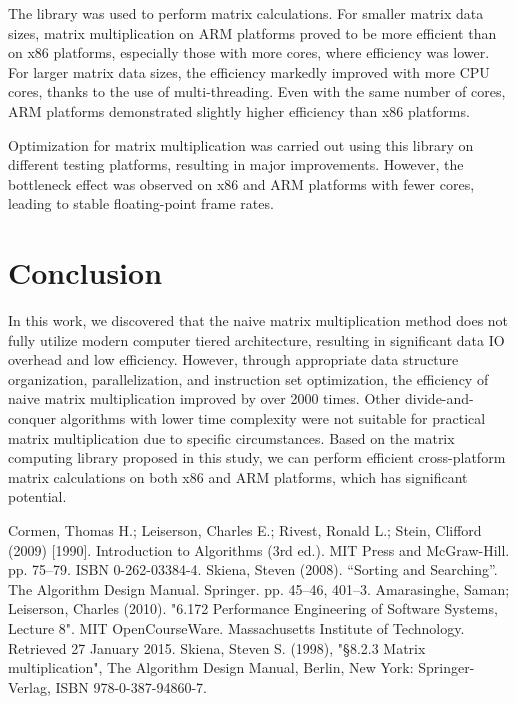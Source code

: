 \documentclass[conference]{IEEEtran}
\begin{document}
	The library was used to perform matrix calculations. For smaller matrix data sizes, matrix multiplication on ARM platforms proved to be more efficient than on x86 platforms, especially those with more cores, where efficiency was lower. For larger matrix data sizes, the efficiency markedly improved with more CPU cores, thanks to the use of multi-threading. Even with the same number of cores, ARM platforms demonstrated slightly higher efficiency than x86 platforms.
	
	Optimization for matrix multiplication was carried out using this library on different testing platforms, resulting in major improvements. However, the bottleneck effect was observed on x86 and ARM platforms with fewer cores, leading to stable floating-point frame rates.
	\section{Conclusion}
	
	In this work, we discovered that the naive matrix multiplication method does not fully utilize modern computer tiered architecture, resulting in significant data IO overhead and low efficiency. However, through appropriate data structure organization, parallelization, and instruction set optimization, the efficiency of naive matrix multiplication improved by over 2000 times. Other divide-and-conquer algorithms with lower time complexity were not suitable for practical matrix multiplication due to specific circumstances. Based on the matrix computing library proposed in this study, we can perform efficient cross-platform matrix calculations on both x86 and ARM platforms, which has significant potential.
	
	\begin{thebibliography}{00}
		 Cormen, Thomas H.; Leiserson, Charles E.; Rivest, Ronald L.; Stein, Clifford (2009) [1990]. Introduction to Algorithms (3rd ed.). MIT Press and McGraw-Hill. pp. 75–79. ISBN 0-262-03384-4.
		  Skiena, Steven (2008). ``Sorting and Searching''. The Algorithm Design Manual. Springer. pp. 45–46, 401–3.
		 Amarasinghe, Saman; Leiserson, Charles (2010). "6.172 Performance Engineering of Software Systems, Lecture 8". MIT OpenCourseWare. Massachusetts Institute of Technology. Retrieved 27 January 2015.
		 Skiena, Steven S. (1998), "§8.2.3 Matrix multiplication", The Algorithm Design Manual, Berlin, New York: Springer-Verlag, ISBN 978-0-387-94860-7.
	\end{thebibliography}
\end{document}
